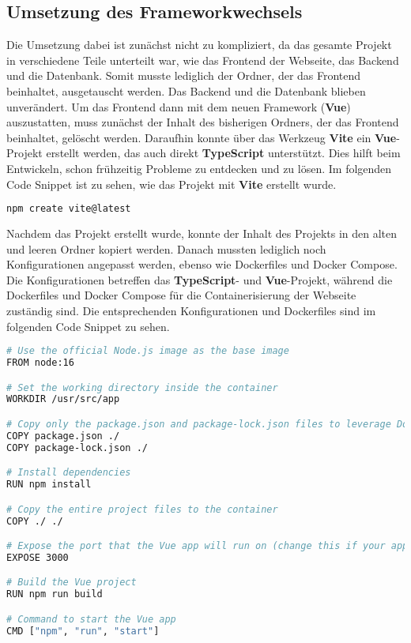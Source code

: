 \subsection{Umsetzung des Frameworkwechsels}

Die Umsetzung dabei ist zunächst nicht zu kompliziert, da das gesamte Projekt in verschiedene Teile unterteilt war, wie das Frontend der Webseite, das Backend und die Datenbank. Somit musste lediglich der Ordner, der das Frontend beinhaltet, ausgetauscht werden. Das Backend und die Datenbank blieben unverändert. Um das Frontend dann mit dem neuen Framework (\textbf{Vue}) auszustatten, muss zunächst der Inhalt des bisherigen Ordners, der das Frontend beinhaltet, gelöscht werden. Daraufhin konnte über das Werkzeug \textbf{Vite} ein \textbf{Vue}-Projekt erstellt werden, das auch direkt \textbf{TypeScript} unterstützt. Dies hilft beim Entwickeln, schon frühzeitig Probleme zu entdecken und zu lösen. Im folgenden Code Snippet ist zu sehen, wie das Projekt mit \textbf{Vite} erstellt wurde.

\begin{lstlisting}[language={bash}, caption={Initialisierung des Vue Projektes mit Vite \cite{vitejs-getting-started}}]
npm create vite@latest
\end{lstlisting}

Nachdem das Projekt erstellt wurde, konnte der Inhalt des Projekts in den alten und leeren Ordner kopiert werden. Danach mussten lediglich noch Konfigurationen angepasst werden, ebenso wie Dockerfiles und Docker Compose. Die Konfigurationen betreffen das \textbf{TypeScript}- und \textbf{Vue}-Projekt, während die Dockerfiles und Docker Compose für die Containerisierung der Webseite zuständig sind. Die entsprechenden Konfigurationen und Dockerfiles sind im folgenden Code Snippet zu sehen.

\begin{lstlisting}[language={bash}, caption={Dockerfile für das Vue Projekt}]
# Use the official Node.js image as the base image
FROM node:16

# Set the working directory inside the container
WORKDIR /usr/src/app

# Copy only the package.json and package-lock.json files to leverage Docker cache
COPY package.json ./
COPY package-lock.json ./

# Install dependencies
RUN npm install

# Copy the entire project files to the container
COPY ./ ./

# Expose the port that the Vue app will run on (change this if your app uses a different port)
EXPOSE 3000

# Build the Vue project
RUN npm run build

# Command to start the Vue app
CMD ["npm", "run", "start"]
\end{lstlisting}

